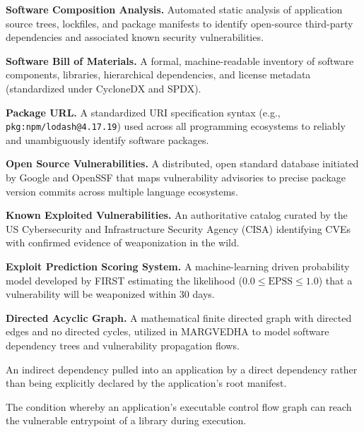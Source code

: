 \documentclass[12pt,a4paper,oneside]{report}
\begin{document}
\begin{description}[leftmargin=3.5cm, style=nextline]
    \item[SCA] \textbf{Software Composition Analysis.} Automated static analysis of application source trees, lockfiles, and package manifests to identify open-source third-party dependencies and associated known security vulnerabilities.
    \item[SBOM] \textbf{Software Bill of Materials.} A formal, machine-readable inventory of software components, libraries, hierarchical dependencies, and license metadata (standardized under CycloneDX and SPDX).
    \item[PURL] \textbf{Package URL.} A standardized URI specification syntax (e.g., \texttt{pkg:npm/lodash@4.17.19}) used across all programming ecosystems to reliably and unambiguously identify software packages.
    \item[OSV] \textbf{Open Source Vulnerabilities.} A distributed, open standard database initiated by Google and OpenSSF that maps vulnerability advisories to precise package version commits across multiple language ecosystems.
    \item[KEV] \textbf{Known Exploited Vulnerabilities.} An authoritative catalog curated by the US Cybersecurity and Infrastructure Security Agency (CISA) identifying CVEs with confirmed evidence of weaponization in the wild.
    \item[EPSS] \textbf{Exploit Prediction Scoring System.} A machine-learning driven probability model developed by FIRST estimating the likelihood ($0.0 \le \text{EPSS} \le 1.0$) that a vulnerability will be weaponized within 30 days.
    \item[DAG] \textbf{Directed Acyclic Graph.} A mathematical finite directed graph with directed edges and no directed cycles, utilized in MARGVEDHA to model software dependency trees and vulnerability propagation flows.
    \item[Transitive Dependency] An indirect dependency pulled into an application by a direct dependency rather than being explicitly declared by the application's root manifest.
    \item[Reachability] The condition whereby an application's executable control flow graph can reach the vulnerable entrypoint of a library during execution.
\end{description}

\end{document}
